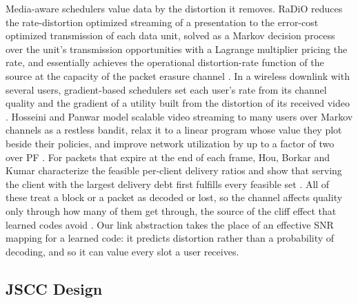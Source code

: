 Media-aware schedulers value data by the distortion it removes. RaDiO reduces the rate-distortion
optimized streaming of a presentation to the error-cost optimized transmission of each data unit,
solved as a Markov decision process over the unit's transmission opportunities with a Lagrange
multiplier pricing the rate, and essentially achieves the operational distortion-rate function of
the source at the capacity of the packet erasure channel \cite{Chou06}. In a wireless downlink with
several users, gradient-based schedulers set each user's rate from its channel quality and the
gradient of a utility built from the distortion of its received video \cite{Pahalawatta07}.
Hosseini and Panwar model scalable video streaming to many users over Markov channels as a
restless bandit, relax it to a linear program whose value they plot beside their policies, and
improve network utilization by up to a factor of two over PF \cite{Hosseini19}. For packets that
expire at the end of each frame, Hou, Borkar and Kumar characterize the feasible
per-client delivery ratios and show that serving the client with the largest delivery debt first
fulfills every feasible set \cite{HouBorkar09}. All of these treat a block or a packet as decoded
or lost, so the channel affects quality only through how many of them get through, the source of
the cliff effect that learned codes avoid \cite{Bourtsoulatze19}. Our link abstraction takes the
place of an effective SNR mapping for a learned code: it predicts distortion rather than a
probability of decoding, and so it can value every slot a user receives.

\subsection{JSCC Design}
\label{sec:related-jscc}

